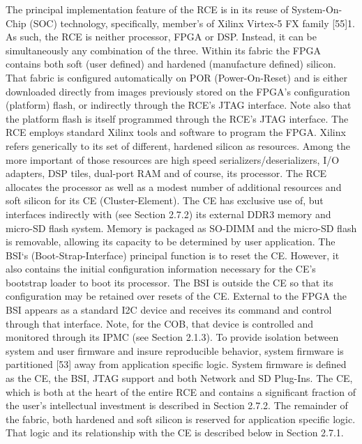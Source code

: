 The principal implementation feature of the RCE is in its reuse of System-On-Chip (SOC) technology, specifically, member's of Xilinx Virtex-5 FX family [55]1. As such, the RCE is neither processor, FPGA or DSP. Instead, it can be simultaneously any combination of the three. Within its fabric the FPGA contains both soft (user defined) and hardened (manufacture defined) silicon. That fabric is configured automatically on POR (Power-On-Reset) and is either downloaded directly from images previously stored on the FPGA's configuration (platform) flash, or indirectly through the RCE's JTAG interface. Note also that the platform flash is itself programmed through the RCE's JTAG interface. The RCE employs standard Xilinx tools and software to program the FPGA.
Xilinx refers generically to its set of different, hardened silicon as resources. Among the more important of those resources are high speed serializers/deserializers, I/O adapters, DSP tiles, dual-port RAM and of course, its processor. The RCE allocates the processor as well as a modest number of additional resources and soft silicon for its CE (Cluster-Element). The CE has exclusive use of, but interfaces indirectly with (see Section 2.7.2) its external DDR3 memory and micro-SD flash system. Memory is packaged as SO-DIMM and the micro-SD flash is removable, allowing its capacity to be determined by user application.
The BSI‘s (Boot-Strap-Interface) principal function is to reset the CE. However, it also contains the initial configuration information necessary for the CE's bootstrap loader to boot its processor. The BSI is outside the CE so that its configuration may be retained over resets of the CE. External to the FPGA the BSI appears as a standard I2C device and receives its command and control through that interface. Note, for the COB, that device is controlled and monitored through its IPMC (see Section 2.1.3).
To provide isolation between system and user firmware and insure reproducible behavior, system firmware is partitioned [53] away from application specific logic. System firmware is defined as the CE, the BSI, JTAG support and both Network and SD Plug-Ins.
The CE, which is both at the heart of the entire RCE and contains a significant fraction of the user's intellectual investment is described in Section 2.7.2. The remainder of the fabric, both hardened and soft silicon is reserved for application specific logic. That logic and its relationship with the CE is described below in Section 2.7.1.

